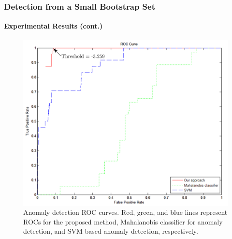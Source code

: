 
\begin{frame}
    \frametitle{Detection from a Small Bootstrap Set}
    \framesubtitle{Experimental Results (cont.)}

    \begin{figure}
        \centering
        \includegraphics[width=0.5\linewidth]{figures/roc-ours-vs-ml-results}
        \caption{Anomaly
            detection ROC curves. Red, green, and blue lines represent ROCs
            for the proposed method, Mahalanobis classifier for anomaly 
            detection, and SVM-based anomaly detection, respectively.}
        \label{fig:batch-roc-results}
    \end{figure}

\end{frame}


